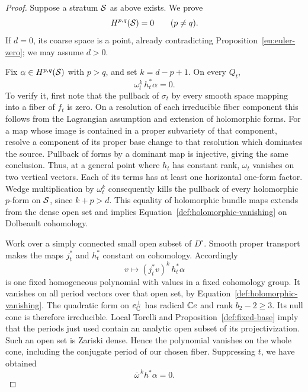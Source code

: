 \begin{proof}
Suppose a stratum $\mathcal S$ as above exists.  We prove
\begin{equation}\label{def:diagonal-hodge}
                 H^{p,q}(\mathcal S)=0\qquad(p\ne q).
\end{equation}
If $d=0$, its coarse space is a point, already contradicting
Proposition~\ref{eu:euler-zero}; we may assume $d>0$.

Fix $\alpha\in H^{p,q}(\mathcal S)$ with $p>q$, and set
$k=d-p+1$.  On every $Q_t$,
\begin{equation}\label{def:holomorphic-vanishing}
                    \omega_t^k\,h_t^*\alpha=0.
\end{equation}
To verify it, first note that the pullback of $\sigma_t$ by every
smooth space mapping into a fiber of $f_t$ is zero.  On a resolution
of each irreducible fiber component this follows from the
Lagrangian assumption and extension of holomorphic forms.
For a map whose image is contained in a proper subvariety of that
component, resolve a component of its proper base change to that
resolution which dominates the source.  Pullback of forms by a
dominant map is injective, giving the same conclusion.
Thus, at a general point where $h_t$ has constant rank,
$\omega_t$ vanishes on two vertical vectors.  Each of its terms
has at least one horizontal one-form factor.  Wedge multiplication
by $\omega_t^k$ consequently kills the pullback of every
holomorphic $p$-form on $\mathcal S$, since $k+p>d$.  This equality of
holomorphic bundle maps extends from the dense open set and
implies Equation~\eqref{def:holomorphic-vanishing} on Dolbeault
cohomology.

Work over a simply connected small open subset of $D^\circ$.
Smooth proper transport makes the maps $j_t^*$ and $h_t^*$
constant on cohomology.  Accordingly
\[
 v\longmapsto (j_t^*v)^k\,h_t^*\alpha
\]
is one fixed homogeneous polynomial with values in a fixed
cohomology group.  It vanishes on all period vectors over that
open set, by Equation~\eqref{def:holomorphic-vanishing}.
The quadratic form on $e^\perp_\mathbb C$ has radical $\mathbb C e$ and rank
$b_2-2\geq3$.  Its null cone is therefore irreducible.  Local
Torelli and Proposition~\ref{def:fixed-base} imply that the
periods just used contain an analytic open subset of its
projectivization.  Such an open set is Zariski dense.  Hence the
polynomial vanishes on the whole cone, including the conjugate
period of our chosen fiber.  Suppressing $t$, we have obtained
\begin{equation}\label{def:antiholomorphic-vanishing}
                       \bar\omega^{\,k}h^*\alpha=0.
\end{equation}


\end{proof}
